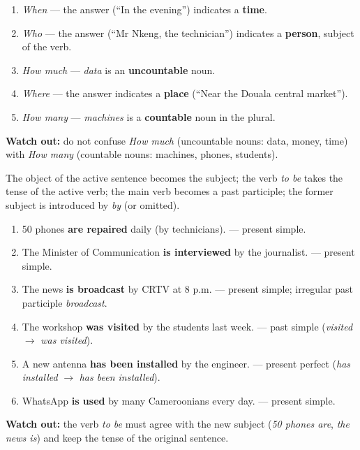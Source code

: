 \documentclass[11pt]{article}
\newcounter{popsec}
\newcounter{popsub}
\newcommand{\courssub}[1]{%
  \stepcounter{popsub}%
  \par\vspace{9pt}\noindent{\popxbold\fontsize{11.5}{13}\selectfont\color{popink}{\color{poporange}\thepopsec.\thepopsub}\hspace{6pt}#1}\par\nopagebreak\vspace{4pt}
}
\begin{document}
\begin{corrige}
\begin{enumerate}
\item \emph{When} --- the answer (``In the evening'') indicates a \textbf{time}.
\item \emph{Who} --- the answer (``Mr Nkeng, the technician'') indicates a \textbf{person}, subject of the verb.
\item \emph{How much} --- \emph{data} is an \textbf{uncountable} noun.
\item \emph{Where} --- the answer indicates a \textbf{place} (``Near the Douala central market'').
\item \emph{How many} --- \emph{machines} is a \textbf{countable} noun in the plural.
\end{enumerate}
\textbf{Watch out:} do not confuse \emph{How much} (uncountable nouns: data, money, time) with \emph{How many} (countable nouns: machines, phones, students).
\end{corrige}

\courssub{I Practice}

\begin{corrige}
\begin{methode}
The object of the active sentence becomes the subject; the verb \emph{to be} takes the tense of the active verb; the main verb becomes a past participle; the former subject is introduced by \emph{by} (or omitted).
\end{methode}
\begin{enumerate}
\item 50 phones \textbf{are repaired} daily (by technicians). --- present simple.
\item The Minister of Communication \textbf{is interviewed} by the journalist. --- present simple.
\item The news \textbf{is broadcast} by CRTV at 8 p.m. --- present simple; irregular past participle \emph{broadcast}.
\item The workshop \textbf{was visited} by the students last week. --- past simple (\emph{visited} $\rightarrow$ \emph{was visited}).
\item A new antenna \textbf{has been installed} by the engineer. --- present perfect (\emph{has installed} $\rightarrow$ \emph{has been installed}).
\item WhatsApp \textbf{is used} by many Cameroonians every day. --- present simple.
\end{enumerate}
\textbf{Watch out:} the verb \emph{to be} must agree with the new subject (\emph{50 phones are}, \emph{the news is}) and keep the tense of the original sentence.
\end{corrige}
\end{document}
